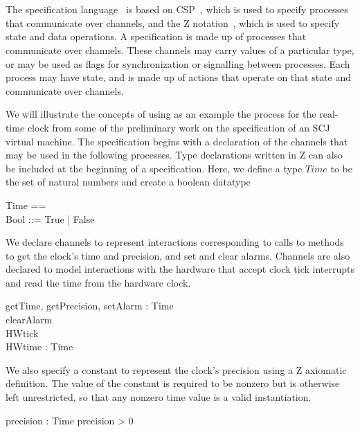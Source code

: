 \documentclass[a4paper,10pt]{report}
\begin{document}
\section{\Circus{}}
\label{circus-section}

The \Circus{} specification language~\cite{oliveira2009} is based on
CSP~\cite{roscoe2011}, which is used to specify processes that communicate over
channels, and the Z notation~\cite{woodcock1996}, which is used to specify state
and data operations.  A \Circus{} specification is made up of processes that
communicate over channels.  These channels may carry values of a particular
type, or may be used as flags for synchronization or signalling between
processes.  Each process may have state, and is made up of actions that operate
on that state and communicate over channels.

We will illustrate the concepts of \Circus{} using as an example the process for
the real-time clock from some of the preliminary work on the specification of an
SCJ virtual machine. The specification begins with a declaration of the channels
that may be used in the following processes.  Type declarations written in Z can
also be included at the beginning of a \Circus{} specification. Here, we define
a type $Time$ to be the set of natural numbers and create a boolean datatype
%
\begin{zed}
  Time == \nat \\
  Bool ::= True | False \\
\end{zed}
%
We declare channels to represent interactions corresponding to calls to methods
to get the clock's time and precision, and set and clear alarms. Channels are
also declared to model interactions with the hardware that accept clock tick
interrupts and read the time from the hardware clock.
%
\begin{circus}
  \circchannel getTime, getPrecision, setAlarm : Time \\
  \circchannel clearAlarm \\
  \circchannel HWtick \\
  \circchannel HWtime : Time \\
\end{circus}
%
We also specify a constant to represent the clock's precision using a Z
axiomatic definition. The value of the constant is required to be nonzero but is
otherwise left unrestricted, so that any nonzero time value is a valid
instantiation.
%
\begin{axdef}
  precision : Time
\where
  precision > 0
\end{axdef}
\end{document}
